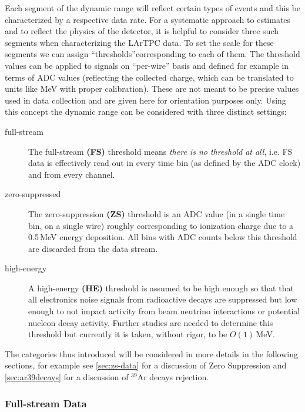 Each segment of the dynamic range will reflect certain types of events and this
be characterized by a respective data rate. For a systematic approach to estimates
and to reflect the physics of the detector, it is helpful to consider three such segments when characterizing the LArTPC data.
To set the scale for these segments we can assign ``thresholds''corresponding to each of them.
The threshold values can be applied to signals on ``per-wire'' basis and defined for example
in terms of ADC values (reflecting the collected charge, which can be translated to units like MeV with proper calibration).
These are not meant to be precise values used in data collection and are given here for orientation purposes only.
Using this concept the dynamic range can be considered with three distinct settings:
\begin{description}
	
\item[full-stream] The full-stream \textbf{(FS)} threshold means \textit{there is no threshold at all}, i.e.
FS data is effectively read out in every time bin (as defined by the ADC clock) and from every channel.

\item[zero-suppressed] The zero-suppression \textbf{(ZS)} threshold is an ADC value (in a single time bin,
on a single wire) roughly corresponding to ionization charge due to a 0.5\,MeV energy deposition.
All bins with ADC counts below this threshold are discarded from the data stream.

\item[high-energy] A high-energy \textbf{(HE)} threshold is assumed to be high enough so that
  that all electronics noise signals from radioactive decays are suppressed but low
  enough to not impact activity from beam neutrino interactions or potential nucleon decay activity.
  Further studies are needed to determine this threshold but currently
  it is taken, without rigor, to be $O(1)$\,MeV.

\end{description}

The categories thus introduced will be considered in more details in the following sections, for example
see \ref{sec:zs-data} for a discussion of Zero Suppression and \ref{sec:ar39decays} for a discussion of
$^{39}$Ar decays rejection.


\subsubsection{Full-stream Data}

